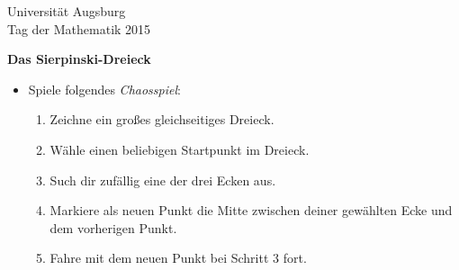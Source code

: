 \documentclass[a4paper,ngerman]{scrartcl}
\newcommand{\drawHere}{%
  \begin{center}%
    \fbox{\parbox[c][0.9\textwidth]{0.9\textwidth}{\ }}%
  \end{center}}
\newcommand{\header}{%
  \begin{raggedleft}
  \tiny Universität Augsburg \\
  Tag der Mathematik 2015 \par
  \end{raggedleft}}
\begin{document}
\newpage




\header

\begin{center}
  \Huge\bf
  Das Sierpinski-Dreieck
\end{center}

\vfill
\drawHere

\vfill
\Large

\renewcommand{\labelitemi}{$\blacktriangle$}

\begin{itemize}
  \item Spiele folgendes \emph{Chaosspiel}:
  \begin{enumerate}
    \item Zeichne ein großes gleichseitiges Dreieck.
    \item Wähle einen beliebigen Startpunkt im Dreieck.
    \item Such dir zufällig eine der drei Ecken aus.
    \item Markiere als neuen Punkt die Mitte zwischen deiner gewählten Ecke und \\ dem
    vorherigen Punkt.
    \item Fahre mit dem neuen Punkt bei Schritt 3 fort.
  \end{enumerate}
\end{itemize}
\end{document}
